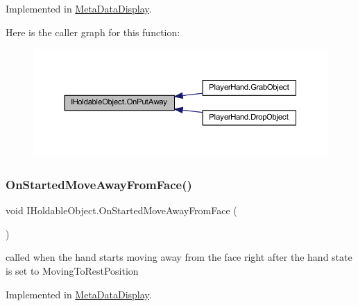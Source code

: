 Implemented in \mbox{\hyperlink{class_meta_data_display_a55888c6c3e3e224d89d95b6c63652762}{Meta\+Data\+Display}}.

Here is the caller graph for this function\+:
\nopagebreak
\begin{figure}[H]
\begin{center}
\leavevmode
\includegraphics[width=350pt]{interface_i_holdable_object_abe7c5e5ed97fb5c908c91da5b8714f0e_icgraph}
\end{center}
\end{figure}
\mbox{\label{interface_i_holdable_object_a75f802a9736db51e5e8d1568689dd11c}} 
\subsubsection{\texorpdfstring{On\+Started\+Move\+Away\+From\+Face()}{OnStartedMoveAwayFromFace()}}
{\footnotesize\ttfamily void I\+Holdable\+Object.\+On\+Started\+Move\+Away\+From\+Face (\begin{DoxyParamCaption}{ }\end{DoxyParamCaption})}





called when the hand starts moving away from the face right after the hand state is set to Moving\+To\+Rest\+Position 

Implemented in \mbox{\hyperlink{class_meta_data_display_a98518b3d82ffd1e428cab9a2328fb018}{Meta\+Data\+Display}}.


